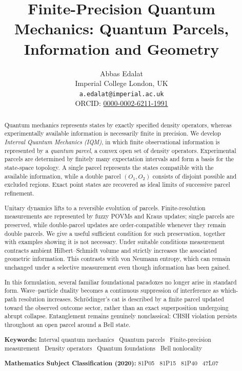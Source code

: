 \documentclass[11pt, onecolumn]{article}
\title{Finite-Precision Quantum Mechanics: Quantum Parcels, Information and Geometry }
\author{
    Abbas Edalat\\
    Imperial College London, UK\\
    \texttt{a.edalat@imperial.ac.uk}\\
    ORCID: \href{https://orcid.org/0000-0002-6211-1991}{0000-0002-6211-1991}}
\providecommand{\keywords}[1]{\par\medskip\noindent\textbf{Keywords:} #1\par}
\providecommand{\subclass}[1]{\par\noindent\textbf{Mathematics Subject Classification (2020):} #1\par}
\begin{document}
\maketitle

\begin{abstract}
Quantum mechanics represents states by exactly specified density operators,
whereas experimentally available information is necessarily finite in
precision. We develop \emph{Interval Quantum Mechanics (IQM)}, in which
finite observational information is represented by a \emph{quantum parcel},
a convex open set of density operators. Experimental parcels are determined
by finitely many expectation intervals and form a basis for the state-space
topology. A single parcel represents the states compatible with the available
information, while a double parcel $(O_1,O_2)$ consists of disjoint possible
and excluded regions. Exact point states are recovered as ideal limits of
successive parcel refinement.

Unitary dynamics lifts to a reversible evolution of parcels. Finite-resolution
measurements are represented by fuzzy POVMs and Kraus updates; single parcels
are preserved, while double-parcel updates are order-compatible whenever they
remain double parcels. We give a useful sufficient condition for such
preservation, together with examples showing it is not necessary. Under
suitable conditions measurement contracts ambient Hilbert--Schmidt volume and
strictly increases the associated geometric information. This contrasts with
von Neumann entropy, which can remain unchanged under a selective measurement
even though information has been gained.

In this formulation, several familiar foundational paradoxes no longer arise
in standard form. Wave--particle duality becomes a continuous suppression of
interference as which-path resolution increases. Schr\"odinger's cat is
described by a finite parcel updated toward the observed outcome sector,
rather than an exact superposition undergoing abrupt collapse. Entanglement
remains genuinely nonclassical: CHSH violation persists throughout an open
parcel around a Bell state.

\keywords{Interval quantum mechanics \textbullet\ Quantum parcels \textbullet\
Finite-precision measurement \textbullet\ Density operators \textbullet\
Quantum foundations \textbullet\ Bell nonlocality}

\subclass{81P05 \textbullet\ 81P15 \textbullet\ 81P40 \textbullet\ 47L07}
\end{abstract}
\end{document}
